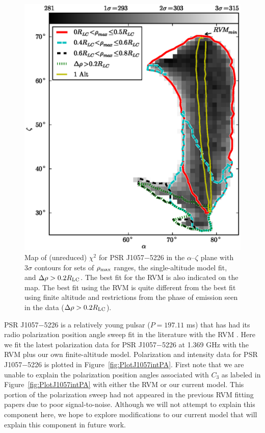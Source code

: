 \begin{figure}[t!!]
\begin{center}
\includegraphics[scale=.8]{chapters/applicationOfNumericalModel/figures/J1057-5226MapTotRhoCut.eps}
\caption[Map of (unreduced) $\chi^{2}$ for PSR J1057$-$5226 in the $\alpha$--$\zeta$ plane]{\label{fig:J1057Map}
Map of (unreduced) $\chi^{2}$ for PSR J1057$-$5226 in the $\alpha$--$\zeta$ plane with $3\sigma$ contours for sets of $\rho_{\rm{max}}$ ranges, 
the single-altitude model fit,
and $\Delta\rho>0.2R_{\rm{LC}}$.  The best fit for the RVM is also indicated on the map.  The best fit using the RVM
is quite different from the best fit using finite altitude and restrictions from the phase of emission
seen in the data ($\Delta\rho>0.2R_{\rm{LC}}$).
}
\end{center}
\end{figure}


PSR J1057$-$5226 is a relatively young pulsar ($P=197.11$ ms) that has had its radio polarization
position angle sweep fit in the literature with the RVM \citep{weltevrede2009mapping}.  
Here we fit the latest polarization data for PSR J1057$-$5226 at 1.369 GHz with 
the RVM plus our own finite-altitude model.  Polarization and intensity 
data for PSR J1057$-$5226 is plotted in 
Figure~\ref{fig:PlotJ1057intPA}.  First note that we are unable
to explain the polarization position angles associated
with $C_{3}$ as labeled in Figure~\ref{fig:PlotJ1057intPA}
with either the RVM or our current model.
This portion of the polarization sweep had not appeared in the previous 
RVM fitting papers due to poor signal-to-noise.  Although we will not
attempt to explain this component here, we hope to explore modifications to 
our current model that will explain this component in future work.

